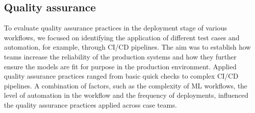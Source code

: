 
 






\subsection{Quality assurance}
To evaluate quality assurance practices %
in the deployment stage of various workflows, we focused on identifying the application of different test cases and automation, for example, through CI/CD pipelines. %
The aim was to establish how teams increase the reliability of the production systems and how they further ensure the models are fit for purpose in the production environment. Applied quality assurance practices ranged from basic quick checks to complex CI/CD pipelines. A combination of factors, such as the complexity of ML workflows, the level of automation in the workflow and the frequency of deployments, influenced 
the quality assurance practices applied across case teams.

